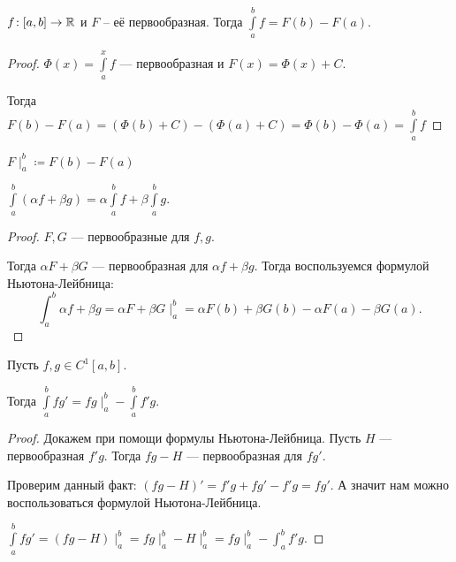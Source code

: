 \begin{theorem}
    $f\!: [a, b] \to \mathbb{R}$ и  $F$ -- её первообразная. Тогда  $\int\limits_a^b f = F(b) - F(a)$.
\end{theorem}
\begin{proof}
    $\Phi(x) = \int\limits_a^x f$ --- первообразная и  $F(x) = \Phi(x) + C$.

    Тогда  $F(b) - F(a) = (\Phi(b) + C) - (\Phi(a) + C) = \Phi(b) - \Phi(a) = \int\limits_a^b f$
\end{proof}
\begin{definition}
    $F\mid_a^b \coloneqq F(b) - F(a)$
\end{definition}
\begin{theorem}
    $\int\limits_a^b(\alpha f + \beta g) = \alpha \int\limits_a^b f + \beta \int\limits_a^b g$.
\end{theorem}
\begin{proof}
    $F, G$ --- первообразные для  $f, g$.

    Тогда  $\alpha F + \beta G$ --- первообразная для  $\alpha f + \beta g$. Тогда воспользуемся формулой Ньютона-Лейбница:  \[
        \int_a^b \alpha f + \beta g = \alpha F + \beta G \mid_a^b = \alpha F(b) + \beta G(b) - \alpha F(a) - \beta G(a)
    .\] 
\end{proof}
\begin{theorem}
    Пусть $f, g \in C^{1}[a, b]$.

    Тогда  $\int\limits_a^b fg' = fg \mid_a^b - \int\limits_a^bf'g$.
\end{theorem}
\begin{proof}
    Докажем при помощи формулы Ньютона-Лейбница. Пусть $H$ --- первообразная  $f'g$. Тогда  $fg - H$ --- первообразная для $fg'$.

    Проверим данный факт: $\left(fg - H\right)' = f'g + fg' - f'g = fg'$. А значит нам можно воспользоваться формулой Ньютона-Лейбница.

    $\int\limits_a^b fg' = \left(fg - H\right) \mid_a^b = fg \mid_a^b - H\mid_a^b = fg\mid_a^b - \int_a^b f'g$.
\end{proof}

